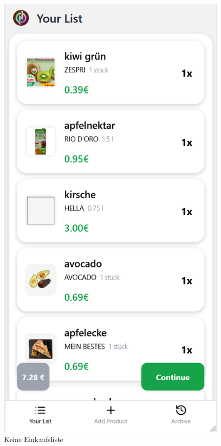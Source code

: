 \begin{figure}[h!]
\begin{minipage}[b]{0.23\textwidth}
        \caption*{Keine Einkaufsliste}
    \end{minipage}
    \hspace{0.01\textwidth}
    \begin{minipage}[b]{0.23\textwidth}
        \includegraphics[width=\textwidth]{media/full-list.png}

\end{minipage}
\end{figure}
